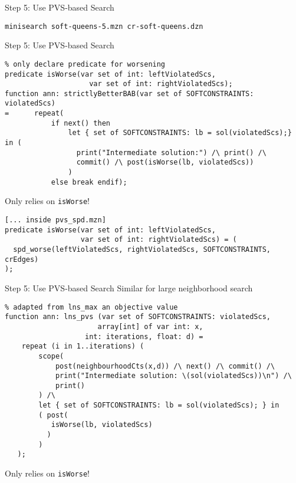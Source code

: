 \documentclass[10pt,xcolor={dvipsnames},fleqn]{beamer}
\begin{document}
\begin{frame}[fragile]{Step 5: Use PVS-based Search}

\small
\begin{verbatim}
minisearch soft-queens-5.mzn cr-soft-queens.dzn 
\end{verbatim}
\end{frame}

\begin{frame}[fragile]{Step 5: Use PVS-based Search}
\begin{lstlisting}
% only declare predicate for worsening
predicate isWorse(var set of int: leftViolatedScs, 
                    var set of int: rightViolatedScs); 
function ann: strictlyBetterBAB(var set of SOFTCONSTRAINTS: violatedScs) 
=      repeat(
           if next() then 
               let { set of SOFTCONSTRAINTS: lb = sol(violatedScs);} in (
                 print("Intermediate solution:") /\ print() /\
                 commit() /\ post(isWorse(lb, violatedScs))
               )
           else break endif);
\end{lstlisting}
\small
Only relies on \texttt{isWorse}!

\begin{lstlisting}
[... inside pvs_spd.mzn]
predicate isWorse(var set of int: leftViolatedScs, 
                  var set of int: rightViolatedScs) = (
  spd_worse(leftViolatedScs, rightViolatedScs, SOFTCONSTRAINTS, crEdges)
);

\end{lstlisting}
\end{frame}

\begin{frame}[fragile]{Step 5: Use PVS-based Search}
Similar for large neighborhood search
\begin{lstlisting}
% adapted from lns_max an objective value 
function ann: lns_pvs (var set of SOFTCONSTRAINTS: violatedScs, 
                      array[int] of var int: x,
                   int: iterations, float: d) = 
    repeat (i in 1..iterations) (
        scope(
            post(neighbourhoodCts(x,d)) /\ next() /\ commit() /\ 
            print("Intermediate solution: \(sol(violatedScs))\n") /\
            print()
        ) /\
        let { set of SOFTCONSTRAINTS: lb = sol(violatedScs); } in 
        ( post(
           isWorse(lb, violatedScs) 
          ) 
        )
   );

\end{lstlisting}
\small
Only relies on \texttt{isWorse}!

\end{frame}
\end{document}
